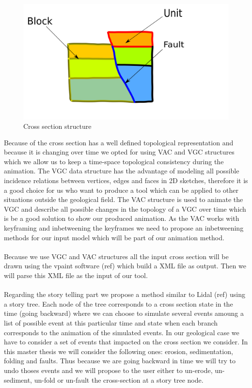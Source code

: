 \documentclass[12pt, a4paper]{memoir} %
\begin{document}
 \begin{figure}[H]
	\centering
	\includegraphics[scale=0.3]{geologyStructEdit.png}
	\caption{Cross section structure}
\end{figure}


Because of the cross section has a well defined topological representation and because it is changing over time we opted for using VAC and VGC structures which we allow us to keep a time-space topological consistency during the animation. The VGC data structure has the advantage of modeling all possible incidence relations between vertices, edges and faces in 2D sketches, therefore it is a good choice for us who want to produce a tool which can be applied to other situations outside the geological field. The VAC structure is used to animate the VGC and describe all possible changes in the topology of a VGC over time which is be a good solution to show our produced animation. As the VAC works with keyframing and inbetweening the keyframes we need to propose an inbetweening methods for our input model which will be part of our animation method.\\\\
  Because we use VGC and VAC structures all the input cross section will be drawn using the vpaint software (ref) which build a XML file as output. Then we will parse this XML file as the input of our tool.\\\\


Regarding the story telling part we propose a method similar to Lidal (ref) using a story tree. Each node of the tree corresponds to a cross section state in the time (going backward) where we can choose to simulate several events amoung a list of possible event at this particular time and state when each branch corresponds to the animation of the simulated events.
In our geological case we have to consider a set of events that impacted on the cross section we consider. In this master thesis we will consider the following ones: erosion, sedimentation, folding and faults. Thus because we are going backward in time we will try to undo thoses events and we will propose to the user either to un-erode, un-sediment, un-fold or un-fault the cross-section at a story tree node. \\\\
\end{document}
